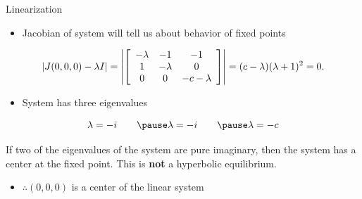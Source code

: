 \documentclass{beamer}
\begin{document}
\begin{frame}{Linearization}
    \begin{itemize}
        \item Jacobian of system will tell us about behavior of fixed points
		\pause
    \end{itemize}
	\[
		|J(0,0,0)-\lambda I| =
		\left|
		\left[
		\begin{array}{c c c}
			-\lambda & -1       & -1         \\
			1        & -\lambda & 0          \\
			0        & 0        & -c-\lambda
		\end{array}
		\right]
		\right| =
		(c-\lambda)(\lambda + 1)^{2}=0.
	\]
	\pause
	\begin{itemize}
		\item System has three eigenvalues
		\pause
	\end{itemize}
	\[
		\lambda=-i\qquad\pause \lambda=-i\qquad\pause\lambda = -c
	\]
	\pause
	\begin{definition}
		If two of the eigenvalues of the system are pure imaginary, then the system has a \alert{center} at the fixed point. This is \textbf{not} a hyperbolic equilibrium.
    \end{definition}
	\pause
	\begin{itemize}
		\item $\therefore (0,0,0)$ is a center of the linear system
	\end{itemize}
\end{frame}
\end{document}
